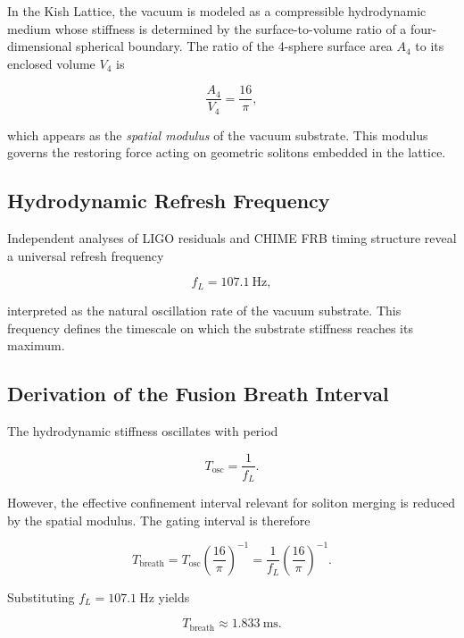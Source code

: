 \documentclass[12pt]{report}
\begin{document}
In the Kish Lattice, the vacuum is modeled as a compressible hydrodynamic
medium whose stiffness is determined by the surface-to-volume ratio of a
four-dimensional spherical boundary. The ratio of the 4-sphere surface area
$A_4$ to its enclosed volume $V_4$ is



\[
\frac{A_4}{V_4} = \frac{16}{\pi},
\]



which appears as the \emph{spatial modulus} of the vacuum substrate. This
modulus governs the restoring force acting on geometric solitons embedded in
the lattice.

\subsection{Hydrodynamic Refresh Frequency}

Independent analyses of LIGO residuals and CHIME FRB timing structure reveal a
universal refresh frequency



\[
f_L = 107.1\ \text{Hz},
\]



interpreted as the natural oscillation rate of the vacuum substrate. This
frequency defines the timescale on which the substrate stiffness reaches its
maximum.

\subsection{Derivation of the Fusion Breath Interval}

The hydrodynamic stiffness oscillates with period



\[
T_{\text{osc}} = \frac{1}{f_L}.
\]



However, the effective confinement interval relevant for soliton merging is
reduced by the spatial modulus. The gating interval is therefore



\[
T_{\text{breath}} = T_{\text{osc}} \left(\frac{16}{\pi}\right)^{-1}
= \frac{1}{f_L}\left(\frac{16}{\pi}\right)^{-1}.
\]



Substituting $f_L = 107.1\ \text{Hz}$ yields



\[
T_{\text{breath}} \approx 1.833\ \text{ms}.
\]
\end{document}
